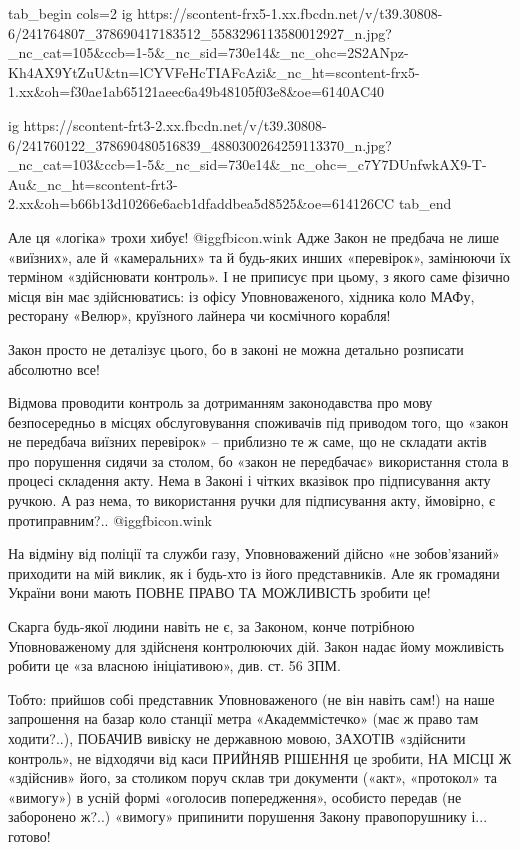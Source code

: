 \ifcmt
tab_begin cols=2
  ig https://scontent-frx5-1.xx.fbcdn.net/v/t39.30808-6/241764807_378690417183512_5583296113580012927_n.jpg?_nc_cat=105&ccb=1-5&_nc_sid=730e14&_nc_ohc=2S2ANpz-Kh4AX9YtZuU&tn=lCYVFeHcTIAFcAzi&_nc_ht=scontent-frx5-1.xx&oh=f30ae1ab65121aeec6a49b48105f03e8&oe=6140AC40

  ig https://scontent-frt3-2.xx.fbcdn.net/v/t39.30808-6/241760122_378690480516839_4880300264259113370_n.jpg?_nc_cat=103&ccb=1-5&_nc_sid=730e14&_nc_ohc=_c7Y7DUnfwkAX9-T-Au&_nc_ht=scontent-frt3-2.xx&oh=b66b13d10266e6acb1dfaddbea5d8525&oe=614126CC
tab_end
\fi

Але ця «логіка» трохи хибує!  @igg{fbicon.wink}  Адже Закон не предбача не лише «виїзних», але й
«камеральних» та й будь-яких инших «перевірок», замінюючи їх терміном
«здійснювати контроль». І не приписує при цьому, з якого саме фізично місця він
має здійснюватись: із офісу Уповноваженого, хідника коло МАФу, ресторану
«Велюр», круїзного лайнера чи космічного корабля!

Закон просто не деталізує цього, бо в законі не можна детально розписати
абсолютно все!

Відмова проводити контроль за дотриманням законодавства про мову безпосередньо
в місцях обслуговування споживачів під приводом того, що «закон не передбача
виїзних перевірок» – приблизно те ж саме, що не складати актів про порушення
сидячи за столом, бо «закон не передбачає» використання стола в процесі
складення акту. Нема в Законі і чітких вказівок про підписування акту ручкою. А
раз нема, то використання ручки для підписування акту, ймовірно, є
протиправним?..  @igg{fbicon.wink}  

На відміну від поліції та служби газу, Уповноважений дійсно «не зобов’язаний»
приходити на мій виклик, як і будь-хто із його представників. Але як громадяни
України вони мають ПОВНЕ ПРАВО ТА МОЖЛИВІСТЬ зробити це!

Скарга будь-якої людини навіть не є, за Законом, конче потрібною Уповноваженому
для здійсненя контролюючих дій. Закон надає йому можливість робити це «за
власною ініціативою», див. ст. 56 ЗПМ.

Тобто: прийшов собі представник Уповноваженого (не він навіть сам!) на наше
запрошення на базар коло станції метра «Академмістечко» (має ж право там
ходити?..), ПОБАЧИВ вивіску не державною мовою, ЗАХОТІВ «здійснити контроль»,
не відходячи від каси ПРИЙНЯВ РІШЕННЯ це зробити, НА МІСЦІ Ж «здійснив» його,
за столиком поруч склав три документи («акт», «протокол» та «вимогу») в усній
формі «оголосив попередження», особисто передав (не заборонено ж?..) «вимогу»
припинити порушення Закону правопорушнику і... готово!

